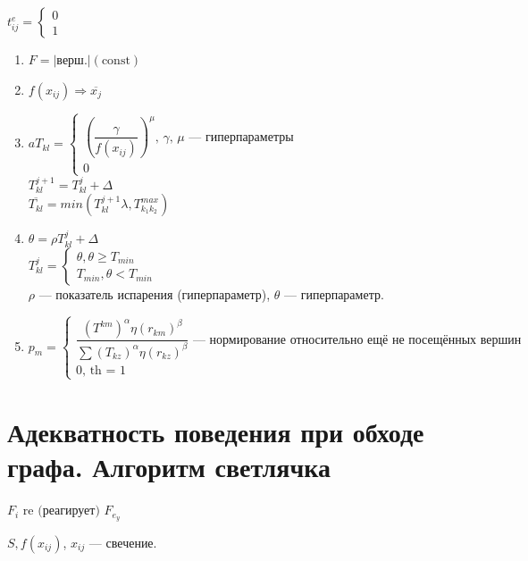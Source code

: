 \documentclass[12pt]{article}
\begin{document}
$t^e_{ij} = \begin{cases} 0 \\ 1 \end{cases}$

\begin{enumerate}
    \item $F = |\text{верш.}|(\text{const})$
    \item $f(x_{ij}) \Rightarrow \overline{x_j}$
    \item $aT_{kl} = \begin{cases}
                  (\dfrac{\gamma}{f(x_{ij})})^\mu \text{, $\gamma$, $\mu$ — гиперпараметры} \\
                  0
              \end{cases}$ \\
          $T_{kl}^{j + 1} = T_{kl}^j + \Delta$ \\
          $\overline{T_{kl}} = min(T_{kl}^{j+1} \lambda, T_{k_1k_2}^{max})$
    \item $\theta = \rho T_{kl}^j + \Delta$ \\
          $T_{kl}^j = \begin{cases}
                  \theta, \theta \geq T_{min} \\
                  T_{min}, \theta < T_{min}
              \end{cases}$ \\
          $\rho$ — показатель испарения (гиперпараметр), $\theta$ — гиперпараметр.
    \item $p_m = \begin{cases}
                  \dfrac{(T^{km})^\alpha \eta(r_{km})^\beta}{\sum(T_{kz})^\alpha \eta (r_{kz})^\beta} \text{ — нормирование относительно ещё не посещённых вершин} \\
                  0 \text{, th = 1}
              \end{cases}$
\end{enumerate}

\section{Адекватность поведения при обходе графа. Алгоритм светлячка}
$F_i \text{ re (реагирует) } F_{e_y}$

$S, f(x_{ij})$, $x_{ij}$ — свечение.
\end{document}
